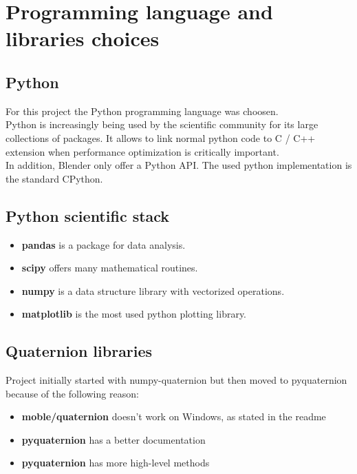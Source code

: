 \chapter{Programming language and libraries choices}
\label{chap:programming_language_libraries_choices}

\section{Python}
For this project the Python programming language \cite{python-website} was choosen. \\
Python is increasingly being used by the scientific community for its large collections of packages. It allows to link normal python code to C / C++ extension when performance optimization is critically important. \\
In addition, Blender only offer a Python API.
The used python implementation is the standard CPython. \\

\section{Python scientific stack}
\begin{itemize}
	\item \textbf{pandas} is a package for data analysis.
	\item \textbf{scipy} offers many mathematical routines.
	\item \textbf{numpy} is a data structure library with vectorized operations. %
	\item \textbf{matplotlib} is the most used python plotting library.
\end{itemize}

\section{Quaternion libraries}

Project initially started with numpy-quaternion \cite{numpy-quaternion} but then moved to pyquaternion \cite{pyquaternion} because of the following reason:
\begin{itemize}
\item \textbf{moble/quaternion} doesn't work on Windows, as stated in the readme
\item \textbf{pyquaternion} has a better documentation
\item \textbf{pyquaternion} has more high-level methods
\end{itemize}

